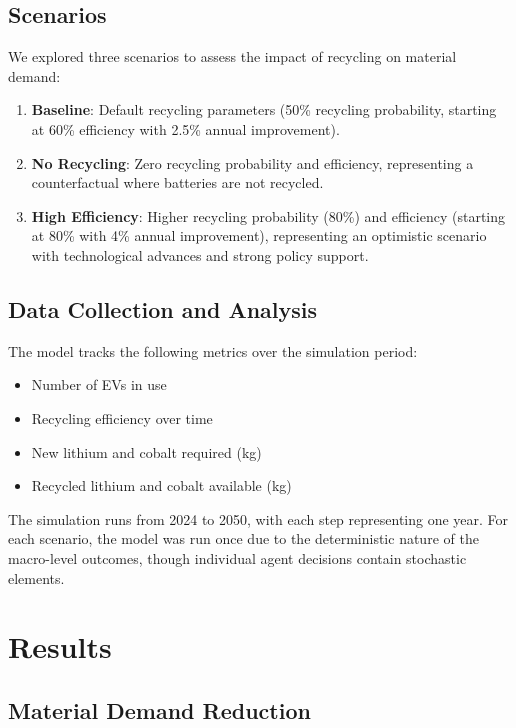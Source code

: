 \documentclass[10pt,a4paper,twocolumn]{article}
\begin{document}
\subsection{Scenarios}

We explored three scenarios to assess the impact of recycling on material demand:

\begin{enumerate}
    \item \textbf{Baseline}: Default recycling parameters (50\% recycling probability, starting at 60\% efficiency with 2.5\% annual improvement).
    \item \textbf{No Recycling}: Zero recycling probability and efficiency, representing a counterfactual where batteries are not recycled.
    \item \textbf{High Efficiency}: Higher recycling probability (80\%) and efficiency (starting at 80\% with 4\% annual improvement), representing an optimistic scenario with technological advances and strong policy support.
\end{enumerate}

\subsection{Data Collection and Analysis}

The model tracks the following metrics over the simulation period:

\begin{itemize}
    \item Number of EVs in use
    \item Recycling efficiency over time
    \item New lithium and cobalt required (kg)
    \item Recycled lithium and cobalt available (kg)
\end{itemize}

The simulation runs from 2024 to 2050, with each step representing one year. For each scenario, the model was run once due to the deterministic nature of the macro-level outcomes, though individual agent decisions contain stochastic elements.

\section{Results}
\label{sec:results}

\subsection{Material Demand Reduction}
\end{document}
